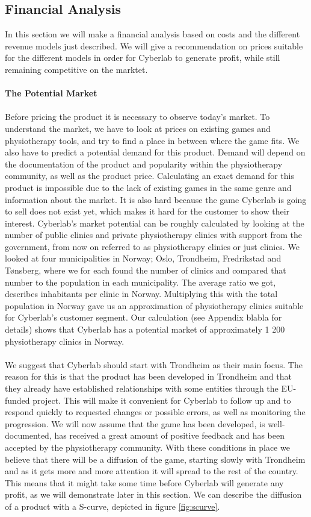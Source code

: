 \subsection{Financial Analysis}
In this section we will make a financial analysis based on costs and the different revenue models just described. We will give a recommendation on prices suitable for the different models in order for Cyberlab to generate profit, while still remaining competitive on the marktet. \\ \\
\textbf{The Potential Market} \\ \\
Before pricing the product it is necessary to observe today's market. To understand the market, we have to look at prices on existing games and physiotherapy tools, and try to find a place in between where the game fits. We also have to predict a potential demand for this product. Demand will depend on the documentation of the product and popularity within the physiotherapy community, as well as the product price. Calculating an exact demand for this product is impossible due to the lack of existing games in the same genre and information about the market. It is also hard because the game Cyberlab is going to sell does not exist yet, which makes it hard for the customer to show their interest. Cyberlab’s market potential can be roughly calculated by looking at the number of public clinics and private physiotherapy clinics with support from the government, from now on referred to as physiotherapy clinics or just clinics. We looked at four municipalities in Norway; Oslo, Trondheim, Fredrikstad and T{ø}nsberg, where we for each found the number of clinics and compared that number to the population in each municipality. The average ratio we got, describes inhabitants per clinic in Norway. Multiplying this with the total population in Norway gave us an approximation of physiotherapy clinics suitable for Cyberlab's customer segment. Our calculation (see Appendix blabla for details) shows that Cyberlab has a potential market of approximately 1 200 physiotherapy clinics in Norway. \\ \\
We suggest that Cyberlab should start with Trondheim as their main focus. The reason for this is that the product has been developed in Trondheim and that they already have established relationships with some entities through the EU- funded project. This will make it convenient for Cyberlab to follow up and to respond quickly to requested changes or possible errors, as well as monitoring the progression. We will now assume that the game has been developed, is well-documented, has received a great amount of positive feedback and has been accepted by the physiotherapy community. With these conditions in place we believe that there will be a diffusion of the game, starting slowly with Trondheim and as it gets more and more attention it will spread to the rest of the country. This means that it might take some time before Cyberlab will generate any profit, as we will demonstrate later in this section. We can describe the diffusion of a product with a S-curve, depicted in figure \ref{fig:scurve}. \\ \\
